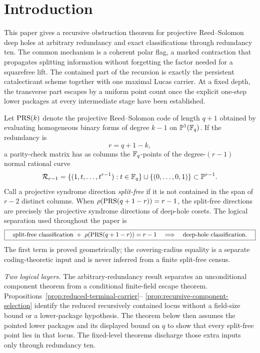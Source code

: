 \section{Introduction}

This paper gives a recursive obstruction theorem for projective
Reed--Solomon deep holes at arbitrary redundancy and exact classifications
through redundancy ten.  The common mechanism is a coherent polar flag, a
marked contraction that propagates splitting information without forgetting
the factor needed for a squarefree lift.  The contained part of the
recursion is exactly the persistent catalecticant scheme together with one
maximal Lucas carrier.  At a fixed depth, the transverse part escapes by a
uniform point count once the explicit one-step lower packages at every
intermediate stage have been established.

Let $\operatorname{PRS}(k)$ denote the projective Reed--Solomon code of length $q+1$
obtained by evaluating homogeneous binary forms of degree $k-1$ on
$\mathbb P^1(\mathbb F_q)$.  If the redundancy is
\[
  r=q+1-k,
\]
a parity-check matrix has as columns the $\mathbb F_q$-points of the
degree-$(r-1)$ normal rational curve
\[
  \mathcal R_{r-1}=\{(1,t,\ldots,t^{r-1}):t\in\mathbb F_q\}
              \cup\{(0,\ldots,0,1)\}\subset\mathbb P^{r-1}.
\]
Call a projective syndrome direction \emph{split-free} if it is not
contained in the span of $r-2$ distinct columns.  When
$\rho(\operatorname{PRS}(q+1-r))=r-1$, the split-free directions are precisely the
projective syndrome directions of deep-hole cosets.  The logical
separation used throughout the paper is
\[
\boxed{\quad
 \text{split-free classification}
 \;+\;\rho(\operatorname{PRS}(q+1-r))=r-1
 \quad\Longrightarrow\quad
 \text{deep-hole classification}.
\quad}
\]
The first term is proved geometrically; the covering-radius equality
is a separate coding-theoretic input and is never inferred from a
finite split-free census.

\noindent\emph{Two logical layers.}
The arbitrary-redundancy result separates an unconditional component theorem
from a conditional finite-field escape theorem.  Propositions~\ref{prop:reduced-terminal-carrier}--%
\ref{prop:recursive-component-selection} identify the reduced recursively
contained locus without a field-size bound or a lower-package hypothesis.
The theorem below then assumes the pointed lower packages and its displayed
bound on \(q\) to show that every split-free point lies in that locus.  The
fixed-level theorems discharge those extra inputs only through redundancy
ten.

